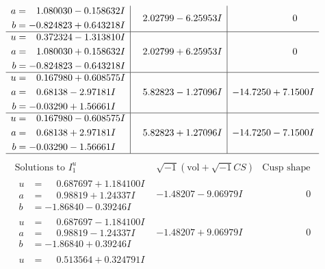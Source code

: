 \documentclass[1p]{elsarticle_modified}
\theoremstyle{definition}
\newcommand{\I}{\sqrt{-1}}
\begin{document}
$$\begin{array}{c|c|c}
\begin{aligned}
a &= \phantom{-}1.080030 - 0.158632 I \\
b &= -0.824823 + 0.643218 I\end{aligned}
 & \phantom{-}2.02799 - 6.25953 I & \phantom{-0.000000 } 0 \\ \hline\begin{aligned}
u &= \phantom{-}0.372324 - 1.313810 I \\
a &= \phantom{-}1.080030 + 0.158632 I \\
b &= -0.824823 - 0.643218 I\end{aligned}
 & \phantom{-}2.02799 + 6.25953 I & \phantom{-0.000000 } 0 \\ \hline\begin{aligned}
u &= \phantom{-}0.167980 + 0.608575 I \\
a &= \phantom{-}0.68138 - 2.97181 I \\
b &= -0.03290 + 1.56661 I\end{aligned}
 & \phantom{-}5.82823 - 1.27096 I & -14.7250 + 7.1500 I \\ \hline\begin{aligned}
u &= \phantom{-}0.167980 - 0.608575 I \\
a &= \phantom{-}0.68138 + 2.97181 I \\
b &= -0.03290 - 1.56661 I\end{aligned}
 & \phantom{-}5.82823 + 1.27096 I & -14.7250 - 7.1500 I\\
 \hline 
 \end{array}$$\newpage$$\begin{array}{c|c|c}  
\text{Solutions to }I^u_{1}& \I (\text{vol} + \sqrt{-1}CS) & \text{Cusp shape}\\
 \hline 
\begin{aligned}
u &= \phantom{-}0.687697 + 1.184100 I \\
a &= \phantom{-}0.98819 + 1.24337 I \\
b &= -1.86840 - 0.39246 I\end{aligned}
 & -1.48207 - 9.06979 I & \phantom{-0.000000 } 0 \\ \hline\begin{aligned}
u &= \phantom{-}0.687697 - 1.184100 I \\
a &= \phantom{-}0.98819 - 1.24337 I \\
b &= -1.86840 + 0.39246 I\end{aligned}
 & -1.48207 + 9.06979 I & \phantom{-0.000000 } 0 \\ \hline\begin{aligned}
u &= \phantom{-}0.513564 + 0.324791 I \\

\end{aligned}
\end{array}$$
\end{document}
